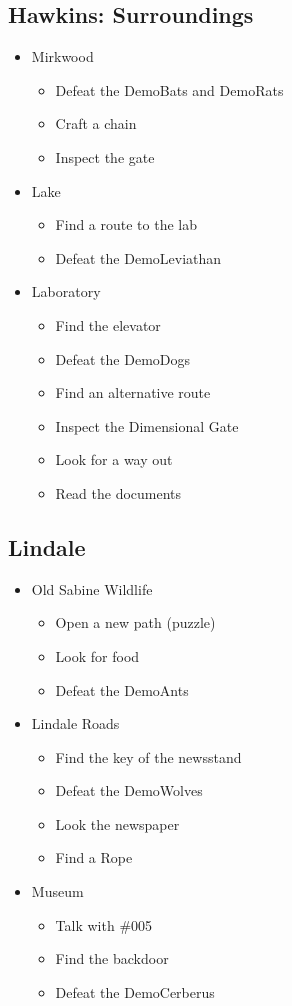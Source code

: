 \subsection{Hawkins: Surroundings}
\begin{itemize}
	\item Mirkwood
	\begin{itemize}
		\item Defeat the DemoBats and DemoRats
		\item Craft a chain
		\item Inspect the gate
	\end{itemize}
	\item Lake
	\begin{itemize}
		\item Find a route to the lab
		\item Defeat the DemoLeviathan
	\end{itemize}
	\item Laboratory
	\begin{itemize}
		\item Find the elevator
		\item Defeat the DemoDogs
		\item Find an alternative route
		\item Inspect the Dimensional Gate
		\item Look for a way out
		\item Read the documents
	\end{itemize}
\end{itemize}

\subsection{Lindale}
\begin{itemize}
	\item Old Sabine Wildlife
	\begin{itemize}
		\item Open a new path (puzzle)
		\item Look for food
		\item Defeat the DemoAnts
	\end{itemize}
	\item Lindale Roads
	\begin{itemize}	
		\item Find the key of the newsstand
		\item Defeat the DemoWolves
		\item Look the newspaper
		\item Find a Rope
	\end{itemize}
	\item Museum
	\begin{itemize}
		\item Talk with \#005
		\item Find the backdoor
		\item Defeat the DemoCerberus
	\end{itemize}
\end{itemize}

